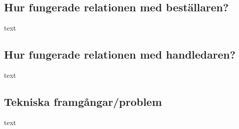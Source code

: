 \documentclass[efterstudie/studie.tex]{subfiles}
\begin{document}
\subsection{Hur fungerade relationen med beställaren?}
text
\subsection{Hur fungerade relationen med handledaren?}
text
\subsection{Tekniska framgångar/problem}
text
\end{document}

